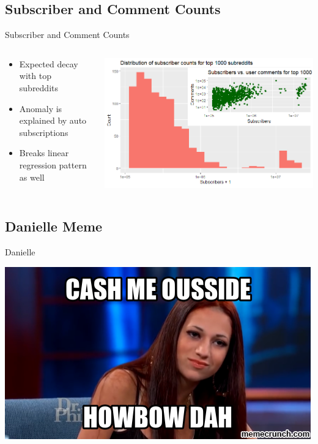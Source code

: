 \documentclass{beamer}
\begin{document}
\subsection{Subscriber and Comment Counts}
\begin{frame}{Subscriber and Comment Counts}
\begin{columns}
    \begin{column}{0.40\textwidth}
        \begin{itemize}
            \item Expected decay with top subreddits
            \item Anomaly is explained by auto subscriptions
            \item Breaks linear regression pattern as well
        \end{itemize}
    \end{column}
    \begin{column}{0.70\textwidth}
        \includegraphics[width=\textwidth]{Plots/inset}
    \end{column}
\end{columns}
\end{frame}



\subsection{Danielle Meme}
\begin{frame}{Danielle}
\begin{center}
    \includegraphics[width=\textwidth]{Plots/Danielle}
\end{center}
\end{frame}
\end{document}
